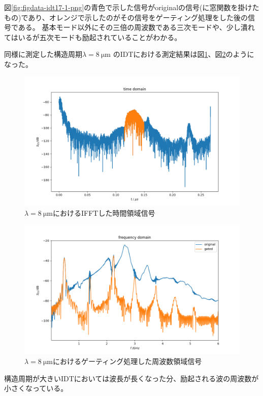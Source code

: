 \documentclass[dvipdfmx,11pt]{jsreport}
\numberwithin{equation}{chapter}
\numberwithin{table}{chapter}
\begin{document}
図\ref{fig:figdata-idt17-1-png}の青色で示した信号がoriginalの信号(に窓関数を掛けたもの)であり、オレンジで示したのがその信号をゲーティング処理をした後の信号である。
基本モード以外にその三倍の周波数である三次モードや、少し潰れてはいるが五次モードも励起されていることがわかる。

同様に測定した構造周期$\lambda=\SI{8}{\micro \metre}$ のIDTにおける測定結果は図\ref{fig:figdata-idt17-2time-png}、図\ref{fig:figdata-idt17-2-png}のようになった。

\begin{figure}[H]
	\centering
	\includegraphics[width=\textwidth]{figdata/idt17-2time.png}
	\caption{$\lambda=\SI{8}{\micro \metre}$におけるIFFTした時間領域信号}
	\label{fig:figdata-idt17-2time-png}
\end{figure}
\begin{figure}[H]
	\centering
	\includegraphics[width=\textwidth]{figdata/idt17-2.png}
	\caption{$\lambda=\SI{8}{\micro \metre}$におけるゲーティング処理した周波数領域信号}
	\label{fig:figdata-idt17-2-png}
\end{figure}
構造周期が大きいIDTにおいては波長が長くなった分、励起される波の周波数が小さくなっている。
\end{document}
